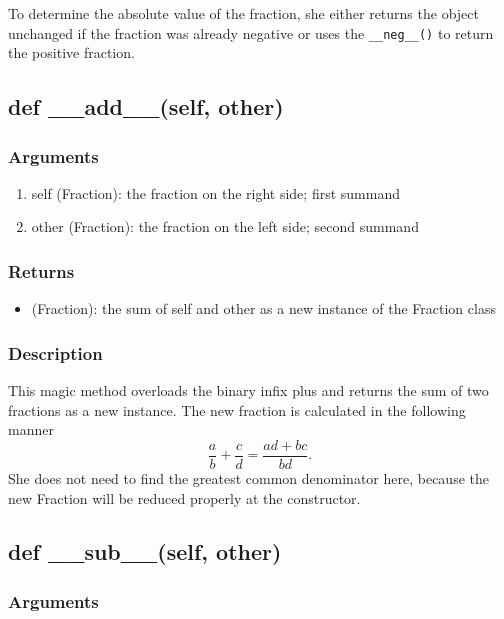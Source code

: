 \documentclass[refman]{scrartcl}
\begin{document}
To determine the absolute value of the fraction, she either returns the object unchanged if the fraction was already negative or uses the \texttt{\_\_neg\_\_()} to return the positive fraction.

\subsection{def \_\_add\_\_(self, other)}

\subsubsection*{Arguments}

\begin{enumerate}
	\item self (Fraction): the fraction on the right side; first summand
	\item other (Fraction): the fraction on the left side; second summand
\end{enumerate}

\subsubsection*{Returns}

\begin{itemize}
	\item (Fraction): the sum of self and other as a new instance of the Fraction class
\end{itemize}

\subsubsection*{Description}

This magic method overloads the binary infix plus and returns the sum of two fractions as a new instance. The new fraction is calculated in the following manner
%
\begin{equation}
	\frac{a}{b} + \frac{c}{d} = \frac{ad + bc}{bd} \text{.}
\end{equation}
%
She does not need to find the greatest common denominator here, because the new Fraction will be reduced properly at the constructor.

\subsection{def \_\_sub\_\_(self, other)}

\subsubsection*{Arguments}
\end{document}
